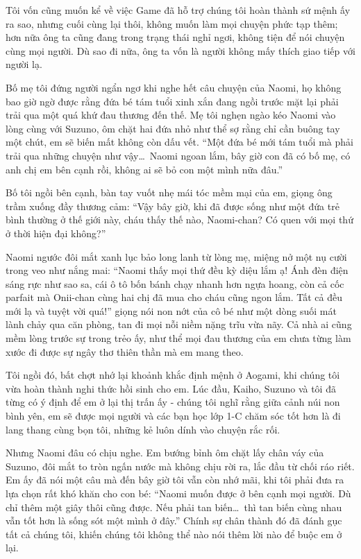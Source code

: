 ﻿\documentclass[../main.tex]{subfiles}
\begin{document}
Tôi vốn cũng muốn kể về việc Game đã hỗ trợ chúng tôi hoàn thành sứ mệnh ấy ra sao, nhưng cuối cùng lại thôi, không muốn làm mọi chuyện phức tạp thêm; hơn nữa ông ta cũng đang trong trạng thái nghỉ ngơi, không tiện để nói chuyện cùng mọi người. Dù sao đi nữa, ông ta vốn là người không mấy thích giao tiếp với người lạ.

Bố mẹ tôi đứng người ngẩn ngơ khi nghe hết câu chuyện của Naomi, họ không bao giờ ngờ được rằng đứa bé tám tuổi xinh xắn đang ngồi trước mặt lại phải trải qua một quá khứ đau thương đến thế. Mẹ tôi nghẹn ngào kéo Naomi vào lòng cùng với Suzuno, ôm chặt hai đứa nhỏ như thể sợ rằng chỉ cần buông tay một chút, em sẽ biến mất không còn dấu vết. ``Một đứa bé mới tám tuổi mà phải trải qua những chuyện như vậy\dots\ Naomi ngoan lắm, bây giờ con đã có bố mẹ, có anh chị em bên cạnh rồi, không ai sẽ bỏ con một mình nữa đâu.''

Bố tôi ngồi bên cạnh, bàn tay vuốt nhẹ mái tóc mềm mại của em, giọng ông trầm xuống đầy thương cảm: ``Vậy bây giờ, khi đã được sống như một đứa trẻ bình thường ở thế giới này, cháu thấy thế nào, Naomi-chan? Có quen với mọi thứ ở thời hiện đại không?''

Naomi ngước đôi mắt xanh lục bảo long lanh từ lòng mẹ, miệng nở một nụ cười trong veo như nắng mai: ``Naomi thấy mọi thứ đều kỳ diệu lắm ạ! Ánh đèn điện sáng rực như sao sa, cái ô tô bốn bánh chạy nhanh hơn ngựa hoang, còn cả cốc parfait mà Onii-chan cùng hai chị đã mua cho cháu cũng ngon lắm. Tất cả đều mới lạ và tuyệt vời quá!'' giọng nói non nớt của cô bé như một dòng suối mát lành chảy qua căn phòng, tan đi mọi nỗi niềm nặng trĩu vừa nãy. Cả nhà ai cũng mềm lòng trước sự trong trẻo ấy, như thể mọi đau thương của em chưa từng làm xước đi được sự ngây thơ thiên thần mà em mang theo.

Tôi ngồi đó, bất chợt nhớ lại khoảnh khắc định mệnh ở Aogami, khi chúng tôi vừa hoàn thành nghi thức hồi sinh cho em. Lúc đầu, Kaiho, Suzuno và tôi đã từng có ý định để em ở lại thị trấn ấy - chúng tôi nghĩ rằng giữa cảnh núi non bình yên, em sẽ được mọi người và các bạn học lớp 1-C chăm sóc tốt hơn là đi lang thang cùng bọn tôi, những kẻ luôn dính vào chuyện rắc rối.

Nhưng Naomi đâu có chịu nghe. Em bướng bỉnh ôm chặt lấy chân váy của Suzuno, đôi mắt to tròn ngấn nước mà không chịu rời ra, lắc đầu từ chối ráo riết. Em ấy đã nói một câu mà đến bây giờ tôi vẫn còn nhớ mãi, khi tôi phải đưa ra lựa chọn rất khó khăn cho con bé: ``Naomi muốn được ở bên cạnh mọi người. Dù chỉ thêm một giây thôi cũng được. Nếu phải tan biến\dots\ thì tan biến cùng nhau vẫn tốt hơn là sống sót một mình ở đây.'' Chính sự chân thành đó đã đánh gục tất cả chúng tôi, khiến chúng tôi không thể nào nói thêm lời nào để buộc em ở lại.
\end{document}
